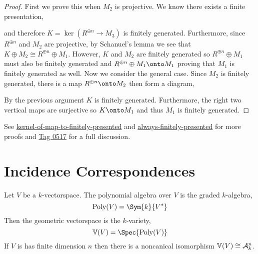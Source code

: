 \documentclass[12pt]{article}
\begin{document}
\begin{proof}
First we prove this when $M_2$ is projective. We know there exists a finite presentation,
\begin{center}
\end{center} 
and therefore $K = \ker{(R^{\oplus n} \to M_3)}$ is finitely generated. Furthermore, since $R^{\oplus n}$ and $M_2$ are projective, by Schanuel's lemma we see that $K \oplus M_2 \cong R^{\oplus n} \oplus M_1$. However, $K$ and $M_2$ are finitely generated so $R^{\oplus n} \oplus M_1$ must also be finitely generated and $R^{\oplus n} \oplus M_1 \onto M_1$ proving that $M_1$ is finitely generated as well. Now we consider the general case. Since $M_2$ is finitely generated, there is a map $R^{\oplus n} \onto M_2$ then form a diagram,
\begin{center}
\end{center}
By the previous argument $K$ is finitely generated. Furthermore, the right two vertical maps are surjective so $K \onto M_1$ and thus $M_1$ is finitely generated. 
\end{proof}

\begin{rmk}
See \href{https://math.stackexchange.com/questions/1201049/is-the-kernel-of-a-map-to-a-finitely-presented-module-finitely-generated}{kernel-of-map-to-finitely-presented} and \href{https://mathoverflow.net/questions/1788/does-finitely-presented-mean-always-finitely-presented-answered-yes}{always-finitely-presented} for more proofs and \href{https://stacks.math.columbia.edu/tag/0517}{Tag 0517} for a full discussion. 
\end{rmk}

\section{Incidence Correspondences}

\begin{defn}
Let $V$ be a $k$-vectorspace. The polynomial algebra over $V$ is the graded $k$-algebra,
\[ \mathrm{Poly}(V) = \Sym{k}{V^*} \]
Then the geometric vectorspace is the $k$-variety,
\[ \mathbb{V}(V) = \Spec{\mathrm{Poly}(V)} \]
If $V$ is has finite dimension $n$ then there is a noncanical isomorphism $\mathbb{V}(V) \cong \mathcal{A}^n_k$.
\end{defn}
\end{document}
